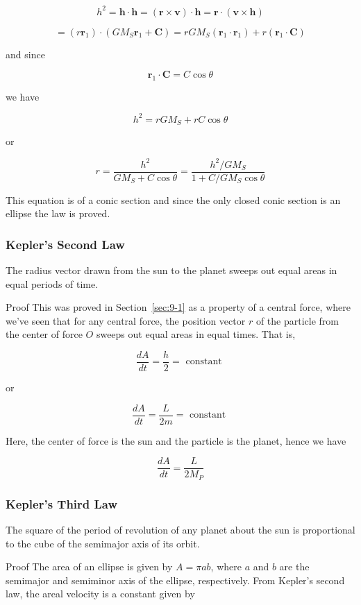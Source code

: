 \documentclass[10pt]{article}
\numberwithin{equation}{section}
\begin{document}
$$
h^{2}=\mathbf{h} \cdot \mathbf{h}=(\mathbf{r} \times \mathbf{v}) \cdot \mathbf{h}=\mathbf{r} \cdot(\mathbf{v} \times \mathbf{h})
$$

$$
=\left(r \mathbf{r}_{1}\right) \cdot\left(G M_{S} \mathbf{r}_{1}+\mathbf{C}\right)=r G M_{S}\left(\mathbf{r}_{1} \cdot \mathbf{r}_{1}\right)+r\left(\mathbf{r}_{1} \cdot \mathbf{C}\right)
$$

and since

$$
\mathbf{r}_{1} \cdot \mathbf{C}=C \cos \theta
$$

we have

$$
h^{2}=r G M_{S}+r C \cos \theta
$$

or

$$
r=\frac{h^{2}}{G M_{S}+C \cos \theta}=\frac{h^{2} / G M_{S}}{1+C / G M_{S} \cos \theta}
$$

This equation is of a conic section and since the only closed conic section is an ellipse the law is proved.

\subsubsection{Kepler's Second Law}\label{sec:9-4-2}
The radius vector drawn from the sun to the planet sweeps out equal areas in equal periods of time.

Proof This was proved in Section~\ref{sec:9-1} as a property of a central force, where we've seen that for any central force, the position vector $r$ of the particle from the center of force $O$ sweeps out equal areas in equal times. That is,

$$
\frac{d A}{d t}=\frac{h}{2}=\text { constant }
$$

or

$$
\frac{d A}{d t}=\frac{L}{2 m}=\text { constant }
$$

Here, the center of force is the sun and the particle is the planet, hence we have

$$
\frac{d A}{d t}=\frac{L}{2 M_{P}}
$$

\subsubsection{Kepler's Third Law}\label{sec:9-4-3}
The square of the period of revolution of any planet about the sun is proportional to the cube of the semimajor axis of its orbit.

Proof The area of an ellipse is given by $A=\pi a b$, where $a$ and $b$ are the semimajor and semiminor axis of the ellipse, respectively. From Kepler's second law, the areal velocity is a constant given by
\end{document}
